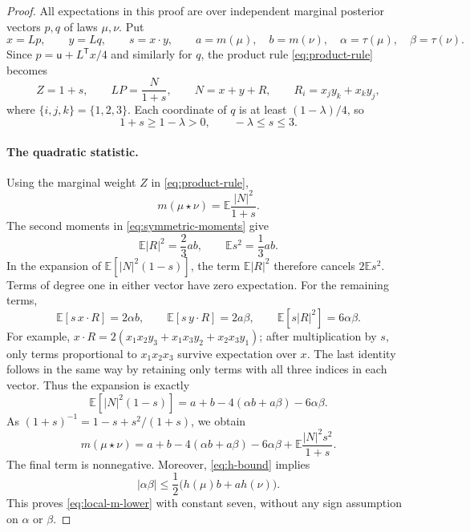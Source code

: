 \documentclass[11pt]{article}
\numberwithin{equation}{section}
\newcommand{\E}{\mathbb E}
\newcommand{\unif}{\mathsf u}
\begin{document}
\begin{proof}
All expectations in this proof are over independent marginal
posterior vectors $p,q$ of laws $\mu,\nu$. Put
\[
 x=Lp,\qquad y=Lq,\qquad s=x\cdot y,
 \qquad a=m(\mu),\quad b=m(\nu),
 \quad \alpha=\tau(\mu),\quad\beta=\tau(\nu).
\]
Since $p=\unif+L^{\mathsf T}x/4$ and similarly for $q$,
the product rule \eqref{eq:product-rule} becomes
\begin{equation}\label{eq:product-coordinates}
 Z=1+s,\qquad LP=\frac{N}{1+s},\qquad
 N=x+y+R,\qquad R_i=x_jy_k+x_ky_j,
\end{equation}
where $\{i,j,k\}=\{1,2,3\}$. Each coordinate of $q$ is at
least $(1-\lambda)/4$, so
\begin{equation}\label{eq:denominator}
 1+s\geq1-\lambda>0,\qquad -\lambda\leq s\leq3.
\end{equation}

\paragraph{The quadratic statistic.}
Using the marginal weight $Z$ in \eqref{eq:product-rule},
\[
 m(\mu\star\nu)=\E\frac{|N|^2}{1+s}.
\]
The second moments in \eqref{eq:symmetric-moments} give
\[
 \E|R|^2=\frac23ab,\qquad \E s^2=\frac13ab.
\]
In the expansion of $\E[|N|^2(1-s)]$, the term
$\E|R|^2$ therefore cancels $2\E s^2$.
Terms of degree one in either vector have zero expectation.
For the remaining terms,
\[
 \E[s\,x\cdot R]=2\alpha b,\qquad
 \E[s\,y\cdot R]=2a\beta,\qquad
 \E[s|R|^2]=6\alpha\beta.
\]
For example,
$x\cdot R=2(x_1x_2y_3+x_1x_3y_2+x_2x_3y_1)$;
after multiplication by $s$, only terms proportional to
$x_1x_2x_3$ survive expectation over $x$. The last identity follows in
the same way by retaining only terms with all three indices in
each vector. Thus the expansion is exactly
\begin{equation}\label{eq:quadratic-cancellation}
 \E[|N|^2(1-s)]
 =a+b-4(\alpha b+a\beta)-6\alpha\beta.
\end{equation}
As $(1+s)^{-1}=1-s+s^2/(1+s)$, we obtain
\begin{equation}\label{eq:exact-m-product}
 m(\mu\star\nu)
 =a+b-4(\alpha b+a\beta)-6\alpha\beta
    +\E\frac{|N|^2s^2}{1+s}.
\end{equation}
The final term is nonnegative. Moreover, \eqref{eq:h-bound}
implies
\[
 |\alpha\beta|\leq
 \frac12\bigl(h(\mu)b+a h(\nu)\bigr).
\]
This proves \eqref{eq:local-m-lower} with constant seven,
without any sign assumption on $\alpha$ or $\beta$.


\end{proof}
\end{document}
